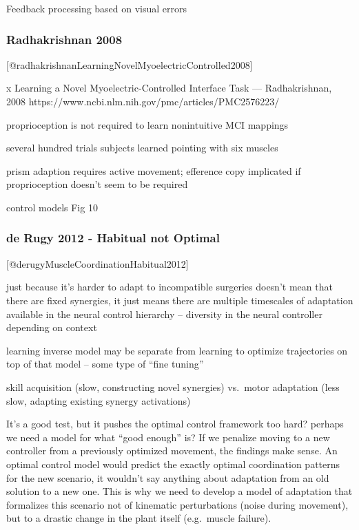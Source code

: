 \documentclass[../main.tex]{subfiles}
\begin{document}
{{{{{{{{{{{Feedback processing based on visual errors

\subsubsection{Radhakrishnan 2008}\label{radhakrishnan-2008}

{[}@radhakrishnanLearningNovelMyoelectricControlled2008{]}

x Learning a Novel Myoelectric-Controlled Interface Task ---
Radhakrishnan, 2008
https://www.ncbi.nlm.nih.gov/pmc/articles/PMC2576223/

proprioception is not required to learn nonintuitive MCI mappings

several hundred trials subjects learned pointing with six muscles

prism adaption requires active movement; efference copy implicated if
proprioception doesn't seem to be required

control models Fig 10

\subsubsection{de Rugy 2012 - Habitual not
Optimal}\label{de-rugy-2012---habitual-not-optimal}

{[}@derugyMuscleCoordinationHabitual2012{]}

just because it's harder to adapt to incompatible surgeries doesn't mean
that there are fixed synergies, it just means there are multiple
timescales of adaptation available in the neural control hierarchy --
diversity in the neural controller depending on context

learning inverse model may be separate from learning to optimize
trajectories on top of that model -- some type of ``fine tuning''

skill acquisition (slow, constructing novel synergies) vs.~motor
adaptation (less slow, adapting existing synergy activations)

It's a good test, but it pushes the optimal control framework too hard?
perhaps we need a model for what ``good enough'' is? If we penalize
moving to a new controller from a previously optimized movement, the
findings make sense. An optimal control model would predict the exactly
optimal coordination patterns for the new scenario, it wouldn't say
anything about adaptation from an old solution to a new one. This is why
we need to develop a model of adaptation that formalizes this scenario
not of kinematic perturbations (noise during movement), but to a drastic
change in the plant itself (e.g.~muscle failure).

}}}}}}}}}}}
\end{document}

